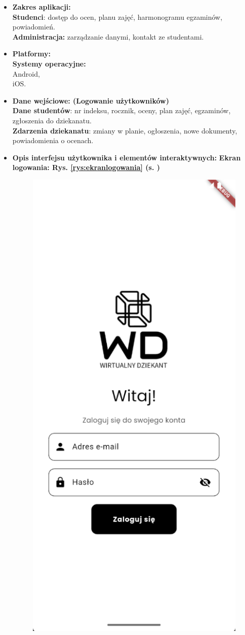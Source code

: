 \begin{itemize}
      \item \textbf{Zakres aplikacji:}
            \\\textbf{Studenci}: dostęp do ocen, planu zajęć, harmonogramu egzaminów, powiadomień.
            \\\textbf{Administracja: }zarządzanie danymi, kontakt ze studentami.
      \item \textbf{Platformy:}
            \\\textbf{Systemy operacyjne:} \\Android, \\iOS.
      \item \textbf{Dane wejściowe: (Logowanie użytkowników)}
            \\\textbf{Dane studentów}: nr indeksu, rocznik, oceny, plan zajęć, egzaminów, zgłoszenia do dziekanatu.
            \\\textbf{Zdarzenia dziekanatu}: zmiany w planie, ogłoszenia, nowe dokumenty, powiadomienia o ocenach.
      \item \textbf{Opis interfejsu użytkownika i elementów interaktywnych:}
            \newpage
            \textbf{Ekran logowania:  Rys. \ref{rys:ekranlogowania} (s. \pageref{rys:ekranlogowania})}
            \begin{figure}[htb!]
                  \centering
                  \includegraphics[width=0.65\linewidth]{rys/ekranlogowania.png}

\end{figure}
\end{itemize}
